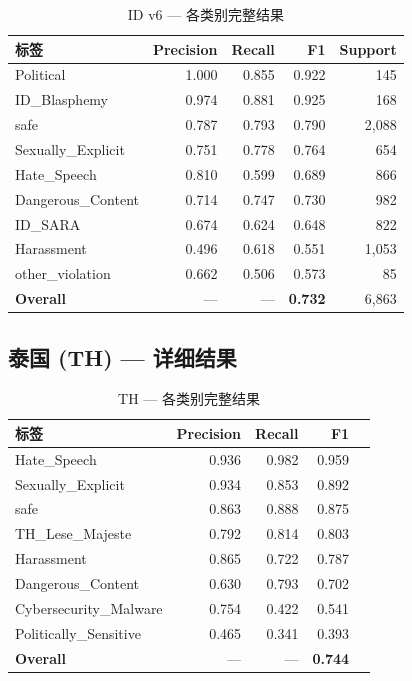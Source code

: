 \documentclass[11pt,a4paper]{article}
\begin{document}
\begin{table}[h]\centering
\caption{ID v6 — 各类别完整结果}\label{tab:id-v6}
\begin{tabular}{@{}lrrrr@{}}
\toprule
\textbf{标签} & \textbf{Precision} & \textbf{Recall} & \textbf{F1} & \textbf{Support} \\
\midrule
Political & 1.000 & 0.855 & 0.922 & 145 \\
ID\_Blasphemy & 0.974 & 0.881 & 0.925 & 168 \\
safe & 0.787 & 0.793 & 0.790 & 2,088 \\
Sexually\_Explicit & 0.751 & 0.778 & 0.764 & 654 \\
Hate\_Speech & 0.810 & 0.599 & 0.689 & 866 \\
Dangerous\_Content & 0.714 & 0.747 & 0.730 & 982 \\
ID\_SARA & 0.674 & 0.624 & 0.648 & 822 \\
Harassment & 0.496 & 0.618 & 0.551 & 1,053 \\
other\_violation & 0.662 & 0.506 & 0.573 & 85 \\
\hline
\textbf{Overall} & — & — & \textbf{0.732} & 6,863 \\
\bottomrule
\end{tabular}
\end{table}

\subsection{泰国 (TH) — 详细结果}

\begin{table}[h]\centering
\caption{TH — 各类别完整结果}\label{tab:th}
\begin{tabular}{@{}lrrrr@{}}
\toprule
\textbf{标签} & \textbf{Precision} & \textbf{Recall} & \textbf{F1} \\
\midrule
Hate\_Speech & 0.936 & 0.982 & 0.959 \\
Sexually\_Explicit & 0.934 & 0.853 & 0.892 \\
safe & 0.863 & 0.888 & 0.875 \\
TH\_Lese\_Majeste & 0.792 & 0.814 & 0.803 \\
Harassment & 0.865 & 0.722 & 0.787 \\
Dangerous\_Content & 0.630 & 0.793 & 0.702 \\
Cybersecurity\_Malware & 0.754 & 0.422 & 0.541 \\
Politically\_Sensitive & 0.465 & 0.341 & 0.393 \\
\hline
\textbf{Overall} & — & — & \textbf{0.744} \\
\bottomrule
\end{tabular}
\end{table}
\end{document}

